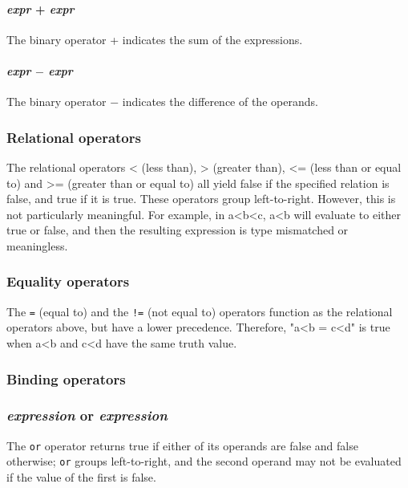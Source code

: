 \paragraph{\textit{expr} + \textit{expr}}
The binary  operator + indicates the sum of the expressions.

\paragraph{\textit{expr} $-$ \textit{expr}}
The binary operator $-$ indicates the difference of the operands.
\\
\subsubsection{Relational operators}
The  relational operators < (less than), > (greater than), <= (less than or equal to) and >= (greater than or equal to) all yield false if the specified relation is false, and true if it is true. These operators group left-to-right. However, this is not particularly meaningful. For example, in a<b<c, a<b will evaluate to either true or false, and then the resulting expression is type mismatched or meaningless.

\begin{alltt}
\quad {} \term{<} 
\quad {} \term{>} 
\quad {} \term{<=} 
\quad {} \term{>=} 
\end{alltt}

\subsubsection{Equality operators}
The \texttt{=} (equal to) and the \texttt{!=} (not equal to) operators function as the relational operators above, but have a lower precedence. Therefore, "a<b = c<d" is true when a<b and c<d have the same truth value.
\begin{alltt}
\quad {} \term{=} 
\quad {} \term{!=} 
\end{alltt}

\subsubsection{Binding operators}

\subsubsection{\textit{expression} or \textit{expression}}
The \texttt{or} operator returns true if either of its operands are false and false otherwise; \texttt{or} groups left-to-right, and the second operand may not be evaluated if the value of the first is false.



